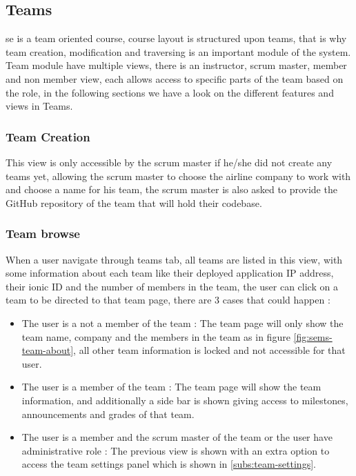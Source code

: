 \subsection{Teams}
\label{sub:teams}
\ac{se} is a team oriented course, course layout is structured upon teams, that is why team creation, modification and traversing is an
important module of the system. Team module have multiple views, there is an instructor, scrum master, member and non member view, each
allows access to specific parts of the team based on the role, in the following sections we have a look on the different features and views
in Teams.

\subsubsection{Team Creation}
\label{subs:team-creation}
This view is only accessible by the scrum master if he/she did not create any teams yet, allowing the scrum master to choose the airline company
to work with and choose a name for his team, the scrum master is also asked to provide the GitHub repository of the team that will hold
their codebase.

\subsubsection{Team browse}
\label{subs:team-browse}
When a user navigate through teams tab, all teams are listed in this view, with some information about each team like their deployed application
IP address, their ionic ID  and the number of members in the team, the user can click on a team to
be directed to that team page, there are 3 cases that could happen :
\begin{itemize}
  \item The user is a not a member of the team : The team page will only show the team name, company and the members in the team as in
  figure \ref{fig:sems-team-about}, all other team information is locked and not accessible for that user.
  \item The user is a member of the team : The team page will show the team information, and additionally a side bar is shown
  giving access to milestones, announcements and grades of that team.
  \item The user is a member and the scrum master of the team or the user have administrative role : The previous view is shown with an extra
  option to access the team settings panel which is shown in \ref{subs:team-settings}.
\end{itemize}

